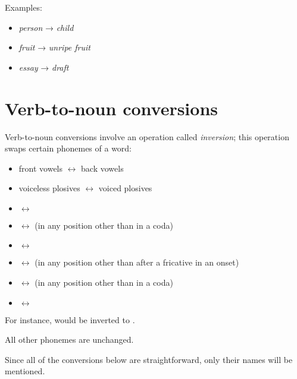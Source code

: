 \documentclass{book}
\begin{document}
Examples:

\begin{itemize}
    \item {} \emph{person} →  \emph{child}
    \item {} \emph{fruit} →  \emph{unripe fruit}
    \item {} \emph{essay} →  \emph{draft}
\end{itemize}

\section{Verb-to-noun conversions}

Verb-to-noun conversions involve an operation called \emph{inversion}; this operation swaps certain phonemes of a word:

\begin{itemize}
    \item front vowels $\leftrightarrow$ back vowels
    \item voiceless plosives $\leftrightarrow$ voiced plosives
    \item {} $\leftrightarrow$ 
    \item {} $\leftrightarrow$  (in any position other than in a coda)
    \item {} $\leftrightarrow$ 
    \item {} $\leftrightarrow$  (in any position other than after a fricative in an onset)
    \item {} $\leftrightarrow$  (in any position other than in a coda)
    \item {} $\leftrightarrow$ 
\end{itemize}

For instance,  would be inverted to .

All other phonemes are unchanged.

Since all of the conversions below are straightforward, only their names will be mentioned.
\end{document}

